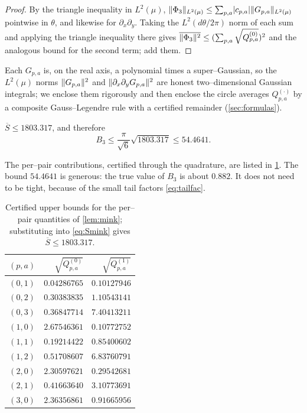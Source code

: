 \documentclass[12pt]{article}
\begin{document}
\begin{proof}
By the triangle inequality in $L^2(\mu)$,
$\lVert\Phi_3\rVert_{L^2(\mu)}\le\sum_{p,a}\lvert c_{p,a}\rvert\lVert G_{p,a}\rVert_{L^2(\mu)}$
pointwise in $\theta$, and likewise for $\partial_x\partial_y$.  Taking the
$L^2(d\theta/2\pi)$ norm of each sum and applying the triangle inequality there
gives $\overline{\lVert\Phi_3\rVert^2}\le(\sum_{p,a}\sqrt{Q^{(0)}_{p,a}})^2$ and the
analogous bound for the second term; add them.
\end{proof}

Each $G_{p,a}$ is, on the real axis, a polynomial times a super--Gaussian, so the
$L^2(\mu)$ norms $\lVert G_{p,a}\rVert^2$ and $\lVert\partial_x\partial_yG_{p,a}\rVert^2$ are
honest two--dimensional Gaussian integrals; we enclose them rigorously and then
enclose the circle averages $Q^{(\cdot)}_{p,a}$ by a composite Gauss--Legendre
rule with a certified remainder (\cref{sec:formulas}).

\begin{lemma}\label{lem:B3val}
$\overline S\le1803.317$, and therefore
\[
   B_3\le\frac{\pi}{\sqrt6}\sqrt{1803.317}\le 54.4641 .
\]
\end{lemma}

The per--pair contributions, certified through the quadrature, are listed in
\cref{tab:Q}.  The bound $54.4641$ is generous: the true value of $B_3$ is about
$0.882$.  It does not need to be tight, because of the small tail factors
\eqref{eq:tailfac}.

\begin{table}[t]\centering
\small
\begin{tabular}{c r r}
\toprule
$(p,a)$ & $\sqrt{Q^{(0)}_{p,a}}$ & $\sqrt{Q^{(1)}_{p,a}}$ \\
\midrule
$(0,1)$ & $0.04286765$ & $0.10127946$ \\
$(0,2)$ & $0.30383835$ & $1.10543141$ \\
$(0,3)$ & $0.36847714$ & $7.40413211$ \\
$(1,0)$ & $2.67546361$ & $0.10772752$ \\
$(1,1)$ & $0.19214422$ & $0.85400602$ \\
$(1,2)$ & $0.51708607$ & $6.83760791$ \\
$(2,0)$ & $2.30597621$ & $0.29542681$ \\
$(2,1)$ & $0.41663640$ & $3.10773691$ \\
$(3,0)$ & $2.36356861$ & $0.91665956$ \\
\bottomrule
\end{tabular}
\caption{Certified upper bounds for the per--pair quantities of
\cref{lem:mink}; substituting into \eqref{eq:Smink} gives
$\overline S\le1803.317$.}
\label{tab:Q}
\end{table}
\end{document}
